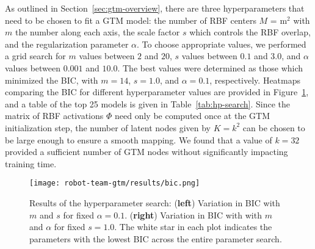 As outlined in Section~\ref{sec:gtm-overview}, there are three hyperparameters that need to be chosen to fit a GTM model: the number of RBF centers $M$ = m$^2$ with $m$ the number along each axis, the scale factor $s$ which controls the RBF overlap, and the regularization parameter $\alpha$. To choose appropriate values, we performed a grid search for $m$ values between $2$ and $20$, $s$ values between $0.1$ and $3.0$, and $\alpha$ values between $0.001$ and $10.0$. The best values were determined as those which minimized the BIC, with $m=14$, $s=1.0$, and $\alpha=0.1$, respectively. Heatmaps comparing the BIC for different hyperparameter values are provided in Figure~\ref{fig:hp-results}, and a table of the top 25 models is given in Table~\ref{tab:hp-search}.  Since the matrix of RBF activations $\Phi$ need only be computed once at the GTM initialization step, the number of latent nodes given by $K=k^2$ can be chosen to be large enough to ensure a smooth mapping. We found that a value of $k=32$ provided a sufficient number of GTM nodes without significantly impacting training time.

\begin{figure}[H]
  \centering
  \texttt{[image: robot-team-gtm/results/bic.png]}
  \caption{Results of the hyperparameter search: (\textbf{left}) Variation in
    BIC with $m$ and $s$ for fixed $\alpha=0.1$. (\textbf{right}) Variation in
    BIC with with $m$ and $\alpha$ for fixed $s=1.0$. The white star in each
    plot indicates the parameters with the lowest BIC across the entire
    parameter search.}
  \label{fig:hp-results}
\end{figure}


